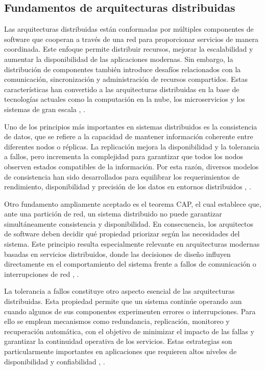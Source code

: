 \documentclass[10pt,conference]{IEEEtran}
\begin{document}
\subsection{Fundamentos de arquitecturas distribuidas}
Las arquitecturas distribuidas están conformadas por múltiples componentes de software que cooperan a través de una red para proporcionar servicios de manera coordinada. Este enfoque permite distribuir recursos, mejorar la escalabilidad y aumentar la disponibilidad de las aplicaciones modernas. Sin embargo, la distribución de componentes también introduce desafíos relacionados con la comunicación, sincronización y administración de recursos compartidos. Estas características han convertido a las arquitecturas distribuidas en la base de tecnologías actuales como la computación en la nube, los microservicios y los sistemas de gran escala \cite{ref1}, \cite{ref2}.

Uno de los principios más importantes en sistemas distribuidos es la consistencia de datos, que se refiere a la capacidad de mantener información coherente entre diferentes nodos o réplicas. La replicación mejora la disponibilidad y la tolerancia a fallos, pero incrementa la complejidad para garantizar que todos los nodos observen estados compatibles de la información. Por esta razón, diversos modelos de consistencia han sido desarrollados para equilibrar los requerimientos de rendimiento, disponibilidad y precisión de los datos en entornos distribuidos \cite{ref3}, \cite{ref4}.

Otro fundamento ampliamente aceptado es el teorema CAP, el cual establece que, ante una partición de red, un sistema distribuido no puede garantizar simultáneamente consistencia y disponibilidad. En consecuencia, los arquitectos de software deben decidir qué propiedad priorizar según las necesidades del sistema. Este principio resulta especialmente relevante en arquitecturas modernas basadas en servicios distribuidos, donde las decisiones de diseño influyen directamente en el comportamiento del sistema frente a fallos de comunicación o interrupciones de red \cite{ref5}, \cite{ref6}.

La tolerancia a fallos constituye otro aspecto esencial de las arquitecturas distribuidas. Esta propiedad permite que un sistema continúe operando aun cuando algunos de sus componentes experimenten errores o interrupciones. Para ello se emplean mecanismos como redundancia, replicación, monitoreo y recuperación automática, con el objetivo de minimizar el impacto de las fallas y garantizar la continuidad operativa de los servicios. Estas estrategias son particularmente importantes en aplicaciones que requieren altos niveles de disponibilidad y confiabilidad \cite{ref7}, \cite{ref8}.
\end{document}
